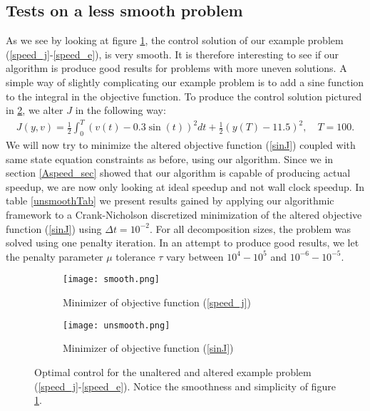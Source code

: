 \subsection{Tests on a less smooth problem}
As we see by looking at figure \ref{smootha}, the control solution of our example problem (\ref{speed_j}-\ref{speed_e}), is very smooth. It is therefore interesting to see if our algorithm is produce good results for problems with more uneven solutions. A simple way of slightly complicating our example problem is to add a sine function to the integral in the objective function. To produce the control solution pictured in \ref{smoothb}, we alter $J$ in the following way:
\begin{align}
J(y,v) = \frac{1}{2}\int_0^{T}(v(t)-0.3\sin(t))^2dt + \frac{1}{2}(y(T)-11.5)^2, \quad T=100. \label{sinJ}
\end{align}
We will now try to minimize the altered objective function (\ref{sinJ}) coupled with same state equation constraints as before, using our algorithm. Since we in section \ref{Aspeed_sec} showed that our algorithm is capable of producing actual speedup, we are now only looking at ideal speedup and not wall clock speedup. In table \ref{unsmoothTab} we present results gained by applying our algorithmic framework to a Crank-Nicholson discretized minimization of the altered objective function (\ref{sinJ}) using $\Delta t = 10^{-2}$. For all decomposition sizes, the problem was solved using one penalty iteration. In an attempt to produce good results, we let the penalty parameter $\mu$ tolerance $\tau$ vary between $10^4-10^5$ and $10^{-6}-10^{-5}$.
\\
\begin{figure}[h]
\centering
\begin{subfigure}{.5\textwidth}
  \centering
  \texttt{[image: smooth.png]}
  \caption{Minimizer of objective function (\ref{speed_j})}
  \label{smootha}
\end{subfigure}%
\begin{subfigure}{.5\textwidth}
  \centering
  \texttt{[image: unsmooth.png]}
  \caption{Minimizer of objective function (\ref{sinJ})}
  \label{smoothb}
\end{subfigure}
\caption{Optimal control for the unaltered and altered example problem (\ref{speed_j}-\ref{speed_e}). Notice the smoothness and simplicity of figure \ref{smootha}.}
\label{smooth}
\end{figure}
